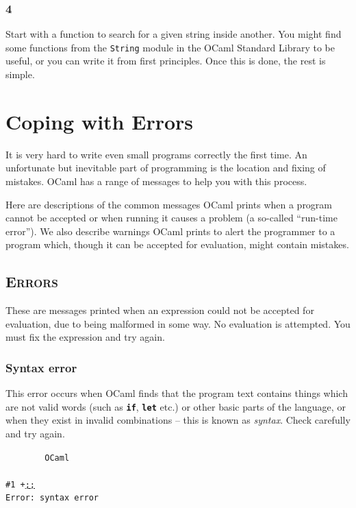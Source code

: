 \documentclass[]{book}
\newcommand{\smspace}{\vspace{4mm}}
\begin{document}
\subsection*{4}
Start with a function to search for a given string inside another. You might find some functions from the \texttt{String} module in the OCaml Standard Library to be useful, or you can write it from first principles. Once this is done, the rest is simple.

\cleardoublepage
\chapter{Coping with Errors}
It is very hard to write even small programs correctly the first time. An unfortunate but inevitable part of programming is the location and fixing of mistakes. OCaml has a range of messages to help you with this process.

Here are descriptions of the common messages OCaml prints when a program cannot be accepted or when running it causes a problem (a so-called ``run-time error''). We also describe warnings OCaml prints to alert the programmer to a program which, though it can be accepted for evaluation, might contain mistakes.

\section*{\scshape Errors}

These are messages printed when an expression could not be accepted for evaluation, due to being malformed in some way. No evaluation is attempted. You must fix the expression and try again.

\subsection*{Syntax error}

This error occurs when OCaml finds that the program text contains things which are not valid words (such as \textbf{\texttt{if}}, \textbf{\texttt{let}} etc.) or other basic parts of the language, or when they exist in invalid combinations -- this is known as \textit{syntax}. Check carefully and try again.

\smspace
\noindent\verb!        OCaml!\\
\noindent\\
\noindent\texttt{\#1 +}\underline{\verb!;;!}\\
\noindent\verb!Error: syntax error!
\smspace
\end{document}
